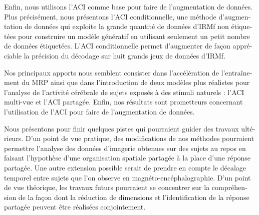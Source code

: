 \begin{otherlanguage}{french}
Enfin, nous utilisons l'ACI comme base pour faire de l'augmentation de données.
%
Plus précisément, nous présentons l’ACI conditionnelle, une méthode d'augmentation de données qui exploite la grande quantité de données d'IRMf non étiquetées pour construire un modèle génératif en utilisant seulement un petit nombre de données étiquetées.
%
L’ACI conditionnelle permet d'augmenter de façon appréciable la précision du décodage sur huit grands jeux de données d'IRMf.

Nos principaux apports nous semblent consister dans l’accélération de l’entraînement du MRP ainsi que dans l’introduction de deux modèles plus réalistes pour l’analyse de l’activité cérébrale de sujets exposés à des stimuli naturels : l’ACI multi-vue et l’ACI partagée.
%
Enfin, nos résultats sont prometteurs concernant l’utilisation de l’ACI pour faire de l’augmentation de données.

Nous présentons pour finir quelques pistes qui pourraient guider des travaux
ultérieurs.
%
D’un point de vue pratique, des modifications de nos
méthodes pourraient permettre l’analyse des données d’imagerie obtenues sur des
sujets au repos en faisant l’hypothèse d’une organisation spatiale partagée à la
place d’une réponse partagée. Une autre extension possible serait de prendre en
compte le décalage temporel entre sujets que l'on observe en magnéto-encéphalographie.
%
D’un point de vue théorique, les travaux futurs
pourraient se concentrer sur la compréhension de la façon dont la réduction de
dimensions et l'identification de la réponse partagée peuvent être réalisées
conjointement.
\end{otherlanguage}

\endgroup

\vfill
